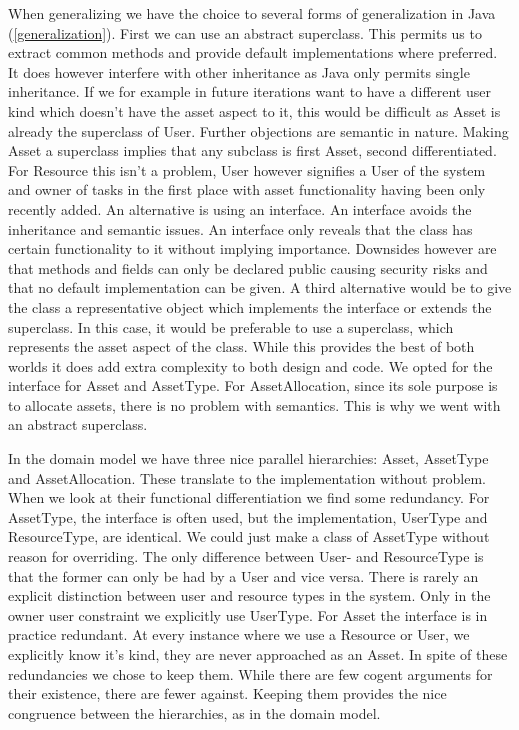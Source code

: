 				When generalizing we have the choice to several forms of generalization in Java (\ref{generalization}). First we can use an abstract superclass. This permits us to extract common methods and provide default implementations where preferred. It does however interfere with other inheritance as Java only permits single inheritance. If we for example in future iterations want to have a different user kind which doesn't have the asset aspect to it, this would be difficult as Asset is already the superclass of User. Further objections are semantic in nature. Making Asset a superclass implies that any subclass is first Asset, second differentiated. For Resource this isn't a problem, User however signifies a User of the system and owner of tasks in the first place with asset functionality having been only recently added. An alternative is using an interface. An interface avoids the inheritance and semantic issues. An interface only reveals that the class has certain functionality to it without implying importance. Downsides however are that methods and fields can only be declared public causing security risks and that no default implementation can be given. A third alternative would be to give the class a representative object which implements the interface or extends the superclass. In this case, it would be preferable to use a superclass, which represents the asset aspect of the class. While this provides the best of both worlds it does add extra complexity to both design and code. We opted for the interface for Asset and AssetType. For AssetAllocation, since its sole purpose is to allocate assets, there is no problem with semantics. This is why we went with an abstract superclass.
				
				In the domain model we have three nice parallel hierarchies: Asset, AssetType and AssetAllocation. These translate to the implementation without problem. When we look at their functional differentiation we find some redundancy. For AssetType, the interface is often used, but the implementation, UserType and ResourceType, are identical. We could just make a class of AssetType without reason for overriding. The only difference between User- and ResourceType is that the former can only be had by a User and vice versa. There is rarely an explicit distinction between user and resource types in the system. Only in the owner user constraint we explicitly use UserType. For Asset the interface is in practice redundant. At every instance where we use a Resource or User, we explicitly know it's kind, they are never approached as an Asset. In spite of these redundancies we chose to keep them. While there are few cogent arguments for their existence, there are fewer against. Keeping them provides the nice congruence between the hierarchies, as in the domain model.
				

